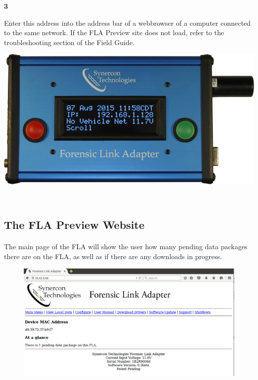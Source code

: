 \documentclass[11pt]{article}
\begin{document}
\noindent\begin{minipage}{0.3\textwidth}%
\begin{center}
\textbf{3}\\[\baselineskip]
\end{center}
Enter this address into the address bar of a webbrowser of a computer connected to the same network. If the FLA Preview site does not load, refer to the troubleshooting section of the Field Guide.
\end{minipage}%
\hfill%
\begin{minipage}{0.6\textwidth}
\includegraphics[width=\linewidth]{../../media/fla_screens/ethernet_and_others/main/title_no_net}
\end{minipage}\\[\baselineskip]
\subsection{The FLA Preview Website}
\paragraph{}
The main page of the FLA will show the user how many pending data packages there are on the FLA, as well as if there are any downloads in progress.
\begin{figure}[tbph]
\centering
\includegraphics[width=.95\linewidth]{../../media/fla_preview_screenshots/main_page}
\label{fig:fla_preview_main_page}
\end{figure}
\end{document}
